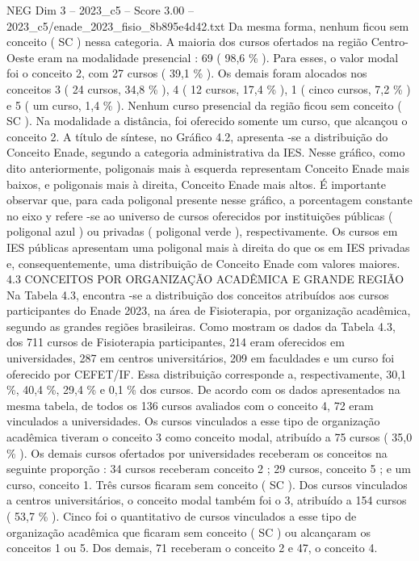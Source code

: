\begin{textsample}{NEG Dim 3 – 2023\_c5 – Score 3.00 – 2023\_c5/enade\_2023\_fisio\_8b895e4d42.txt}
Da mesma forma, nenhum ficou sem conceito ( SC ) nessa categoria.
A maioria dos cursos ofertados na região Centro-Oeste eram na modalidade presencial : 69 ( 98,6 \% ).
Para esses, o valor modal foi o conceito 2, com 27 cursos ( 39,1 \% ).
Os demais foram alocados nos conceitos 3 ( 24 cursos, 34,8 \% ), 4 ( 12 cursos, 17,4 \% ), 1 ( cinco cursos, 7,2 \% ) e 5 ( um curso, 1,4 \% ).
Nenhum curso presencial da região ficou sem conceito ( SC ).
Na modalidade a distância, foi oferecido somente um curso, que alcançou o conceito 2.
A título de síntese, no Gráfico 4.2, apresenta -se a distribuição do Conceito Enade, segundo a categoria administrativa da IES.
Nesse gráfico, como dito anteriormente, poligonais mais à esquerda representam Conceito Enade mais baixos, e poligonais mais à direita, Conceito Enade mais altos.
É importante observar que, para cada poligonal presente nesse gráfico, a porcentagem constante no eixo y refere -se ao universo de cursos oferecidos por instituições públicas ( poligonal azul ) ou privadas ( poligonal verde ), respectivamente.
Os cursos em IES públicas apresentam uma poligonal mais à direita do que os em IES privadas e, consequentemente, uma distribuição de Conceito Enade com valores maiores. 4.3 CONCEITOS POR ORGANIZAÇÃO ACADÊMICA E GRANDE REGIÃO Na Tabela 4.3, encontra -se a distribuição dos conceitos atribuídos aos cursos participantes do Enade 2023, na área de Fisioterapia, por organização acadêmica, segundo as grandes regiões brasileiras.
Como mostram os dados da Tabela 4.3, dos 711 cursos de Fisioterapia participantes, 214 eram oferecidos em universidades, 287 em centros universitários, 209 em faculdades e um curso foi oferecido por CEFET/IF.
Essa distribuição corresponde a, respectivamente, 30,1 \%, 40,4 \%, 29,4 \% e 0,1 \% dos cursos.
De acordo com os dados apresentados na mesma tabela, de todos os 136 cursos avaliados com o conceito 4, 72 eram vinculados a universidades.
Os cursos vinculados a esse tipo de organização acadêmica tiveram o conceito 3 como conceito modal, atribuído a 75 cursos ( 35,0 \% ).
Os demais cursos ofertados por universidades receberam os conceitos na seguinte proporção : 34 cursos receberam conceito 2 ; 29 cursos, conceito 5 ; e um curso, conceito 1.
Três cursos ficaram sem conceito ( SC ).
Dos cursos vinculados a centros universitários, o conceito modal também foi o 3, atribuído a 154 cursos ( 53,7 \% ).
Cinco foi o quantitativo de cursos vinculados a esse tipo de organização acadêmica que ficaram sem conceito ( SC ) ou alcançaram os conceitos 1 ou 5.
Dos demais, 71 receberam o conceito 2 e 47, o conceito 4.

\end{textsample}
